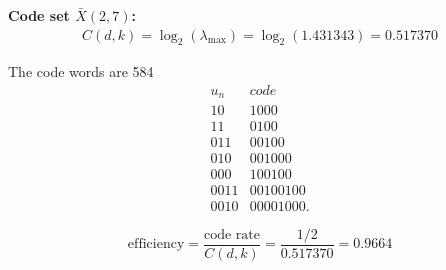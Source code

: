 \begin{example}{\bf Code set $\bar{X}(2,7)$:}
\begin{eqnarray*}
   C(d,k) 
     = \log_2(\lambda_{\mathrm{max}})
     = \log_2(1.431343)
     = 0.517370
\end{eqnarray*}

The code words are \citep{proakis}{584}
\[
\begin{array}{l|l}
   u_n & code \\
   \hline
   10   & 1000     \\
   11   & 0100     \\
   011  & 00100    \\
   010  & 001000   \\
   000  & 100100   \\
   0011 & 00100100 \\
   0010 & 00001000.  
\end{array}
\]

\[
    \mathrm{efficiency} 
    = \frac{\mbox{code rate}}{C(d,k)} 
    = \frac{1/2}{0.517370} 
    = 0.9664
\]
\end{example}






\clearpage
